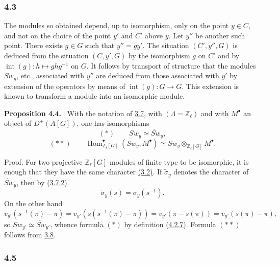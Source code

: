 \documentclass[11pt]{article}
\newenvironment{statement}[1]{\par\medskip\noindent\textbf{#1.}\ }{\par\medskip}
\DeclareMathOperator{\Hom}{Hom}
\providecommand{\Hom}{\operatorname{Hom}}
\providecommand{\Hom}{\operatorname{Hom}}
\begin{document}
\subsubsection*{4.3}\label{sga5:X:subsubsection:4.3}

The modules so obtained depend, up to isomorphism, only on the point $y\in C$, and not on the choice of the point $y'$ and $C'$ above $y$. Let $y''$ be another such point. There exists $g\in G$ such that $y''=g y'$. The situation $(C',y'',G)$ is deduced from the situation $(C,y',G)$ by the isomorphism $g$ on $C'$ and by $\operatorname{int}(g):h\mapsto ghg^{-1}$ on $G$. It follows by transport of structure that the modules $Sw_y$, etc., associated with $y''$ are deduced from those associated with $y'$ by extension of the operators by means of $\operatorname{int}(g):G\to G$. This extension is known to transform a module into an isomorphic module.

\label{sga5:X:proposition:4.4}\begin{statement}{Proposition 4.4}
With the notation of \hyperref[sga5:X:subsubsection:3.7]{3.7}, with $(\Lambda=\mathbb Z_\ell)$ and with $M^\bullet$ an object of $D^+(A[G])$, one has isomorphisms
\[
(*)\qquad Sw_y\simeq \check{Sw}_y,
\]
\[
(**)\qquad
\Hom^\bullet_{\mathbb Z_\ell[G]}(Sw_y,M^\bullet)
\simeq Sw_y\otimes_{\mathbb Z_\ell[G]}M^\bullet.
\]
\end{statement}

Proof. For two projective $\mathbb Z_\ell[G]$-modules of finite type to be isomorphic, it is enough that they have the same character \hyperref[sga5:X:proposition:3.2]{(3.2)}. If $\check\sigma_y$ denotes the character of $\check{Sw}_y$, then by \hyperref[sga5:X:equation:3.7.2]{(3.7.2)}
\[
\check\sigma_y(s)=\sigma_y(s^{-1}).
\]
On the other hand
\[
v_{y'}(s^{-1}(\pi)-\pi)
=v_{y'}(s(s^{-1}(\pi)-\pi))
=v_{y'}(\pi-s(\pi))
=v_{y'}(s(\pi)-\pi),
\]
so $Sw_{y'}\simeq\check{Sw}_{y'}$, whence formula $(*)$ by definition \hyperref[sga5:X:equation:4.2.7]{(4.2.7)}. Formula $(**)$ follows from \hyperref[sga5:X:proposition:3.8]{3.8}.

\subsubsection*{4.5}\label{sga5:X:subsubsection:4.5}
\end{document}
